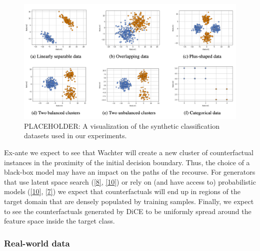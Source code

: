 \documentclass[
  conference]{IEEEtran}
\begin{document}
\begin{figure}

{\centering \includegraphics{www/synthetic_data.png}

}

\caption{\label{fig-synthetic-data}PLACEHOLDER: A visualization of the
synthetic classification datasets used in our experiments.}

\end{figure}

Ex-ante we expect to see that Wachter will create a new cluster of
counterfactual instances in the proximity of the initial decision
boundary. Thus, the choice of a black-box model may have an impact on
the paths of the recourse. For generators that use latent space search
(\protect\hyperlink{ref-joshi2019towards}{{[}8{]}},
\protect\hyperlink{ref-antoran2020getting}{{[}10{]}}) or rely on (and
have access to) probabilistic models
(\protect\hyperlink{ref-antoran2020getting}{{[}10{]}},
\protect\hyperlink{ref-schut2021generating}{{[}7{]}}) we expect that
counterfactuals will end up in regions of the target domain that are
densely populated by training samples. Finally, we expect to see the
counterfactuals generated by DiCE to be uniformly spread around the
feature space inside the target class.

\hypertarget{real-world-data}{%
\subsubsection{Real-world data}\label{real-world-data}}
\end{document}
